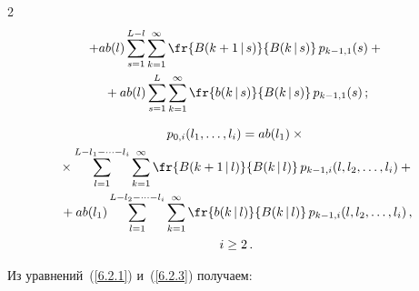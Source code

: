 \begin{multicols}{2}
\begin{multline}
+a b(l)\sum\limits_{s=1}^{L-l}


\sum\limits_{k=1}^\infty


\fr{B(k+1\,|\,s) }{B(k\,|\,s)}\, p_{k-1,1}(s)


+{}\\


{}+


a b(l)


\sum\limits_{s=1}^{L}


\sum\limits_{k=1}^\infty


\fr{b(k\,|\,s)}{ B(k\,|\,s)}\, p_{k-1,1}(s)\,;


\end{multline}





\vspace*{-9pt}





\noindent


\begin{multline}


p_{0,i}(l_1,\ldots,l_i)


= a b(l_1)\times{}\\


{}\times 


\sum\limits_{l=1}^{L-l_1-\cdots-l_i}


\sum\limits_{k=1}^\infty


\fr{B(k+1\,|\,l) }{ B(k\,|\,l)}\,


p_{k-1,i}(l,l_2,\ldots,l_i)


 +{}


\\


{}+


a b(l_1) \sum\limits_{l=1}^{L-l_2-\cdots-l_i}


\sum\limits_{k=1}^\infty


\fr{b(k\,|\,l) }{B(k\,|\,l)}\,


p_{k-1,i}(l,l_2,\ldots,l_i)\,,


\\


i \ge 2\,.


\label{6.2.4}


\end{multline}





Из уравнений~(\ref{6.2.1}) и~(\ref{6.2.3}) получаем:



\end{multicols}
